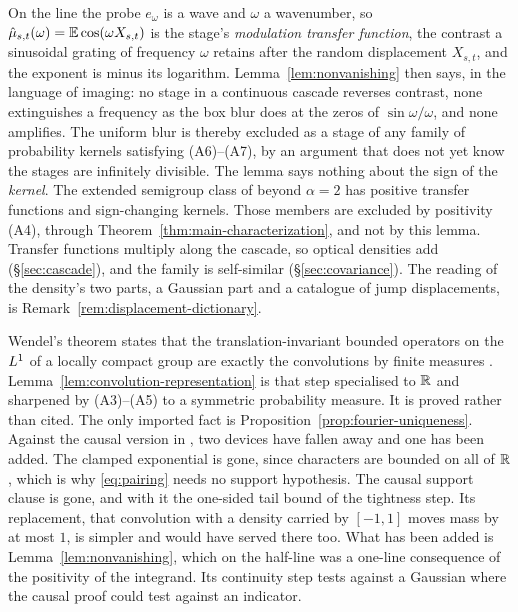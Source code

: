 \begin{remark}\label{rem:modulation-transfer}
On the line the probe $e_\omega$ is a wave and $\omega$ a wavenumber, so
$\hat\mu_{s,t}(\omega) = \mathbb{E}\cos(\omega X_{s,t})$ is the stage's \emph{modulation
transfer function}, the contrast a sinusoidal grating of frequency $\omega$ retains after the
random displacement $X_{s,t}$, and the exponent is minus its logarithm.
Lemma~\ref{lem:nonvanishing} then says, in the language of imaging: no stage in a continuous
cascade reverses contrast, none extinguishes a frequency as the box blur does at the zeros of
$\sin\omega/\omega$, and none amplifies. The uniform blur is thereby excluded as a stage of any
family of probability kernels satisfying (A6)--(A7), by an argument that does not yet know
the stages are infinitely divisible. The lemma says nothing about the sign of the \emph{kernel}. The
extended semigroup class of  beyond $\alpha = 2$ has positive
transfer functions and sign-changing kernels. Those members are excluded by positivity
(A4), through Theorem~\ref{thm:main-characterization}, and not by this lemma.
Transfer functions multiply along the cascade, so optical densities add
(\S\ref{sec:cascade}), and the family is self-similar (\S\ref{sec:covariance}). The reading
of the density's two parts, a Gaussian part and a catalogue of jump displacements, is
Remark~\ref{rem:displacement-dictionary}.
\end{remark}

\begin{remark}\label{rem:wendel}
Wendel's theorem states that the translation-invariant bounded operators on the $L^1$ of a
locally compact group are exactly the convolutions by finite measures
. Lemma~\ref{lem:convolution-representation} is that step specialised
to $\mathbb{R}$ and sharpened by (A3)--(A5) to a symmetric probability measure. It is proved rather
than cited. The only imported fact is Proposition~\ref{prop:fourier-uniqueness}. Against the
causal version in , two devices have fallen away and one has
been added. The clamped exponential is gone, since characters are bounded on all of $\mathbb{R}$,
which is why \ref{eq:pairing} needs no support hypothesis. The causal support clause is
gone, and with it the one-sided tail bound of the tightness step. Its replacement, that
convolution with a density carried by $[-1,1]$ moves mass by at most $1$, is simpler and
would have served there too. What has been added is Lemma~\ref{lem:nonvanishing}, which on
the half-line was a one-line consequence of the positivity of the integrand. Its continuity
step tests against a Gaussian where the causal proof could test against an indicator.
\end{remark}
